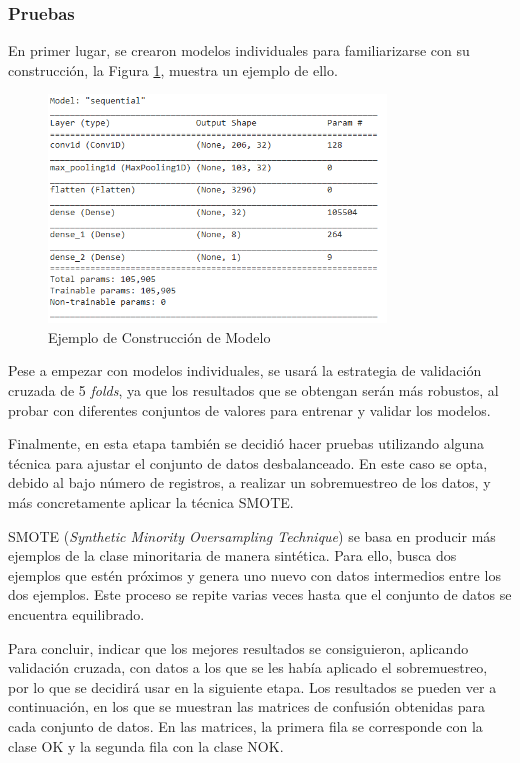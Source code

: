 \subsubsection{Pruebas}
En primer lugar, se crearon modelos individuales para familiarizarse con su construcción, la Figura \ref{f:modelo1}, muestra un ejemplo de ello.  

\begin{figure}[h]
 \centering
  \includegraphics[width=0.8\textwidth]{img/modelo1.PNG}
 \caption{Ejemplo de Construcción de Modelo}
 \label{f:modelo1}
\end{figure}

Pese a empezar con modelos individuales, se usará la estrategia de validación cruzada de 5 \emph{folds}, ya que los resultados que se obtengan serán más robustos, al probar con diferentes conjuntos de valores para entrenar y validar los modelos.

Finalmente, en esta etapa también se decidió hacer pruebas utilizando alguna técnica para ajustar el conjunto de datos desbalanceado. En este caso se opta, debido al bajo número de registros, a realizar un sobremuestreo de los datos, y más concretamente aplicar la técnica SMOTE.

SMOTE (\emph{Synthetic Minority Oversampling Technique}) se basa en producir más ejemplos de la clase minoritaria de manera sintética. Para ello, busca dos ejemplos que estén próximos y genera uno nuevo con datos intermedios entre los dos ejemplos. Este proceso se repite varias veces hasta que el conjunto de datos se encuentra equilibrado.

Para concluir, indicar que los mejores resultados se consiguieron, aplicando validación cruzada, con datos a los que se les había aplicado el sobremuestreo, por lo que se decidirá usar en la siguiente etapa. Los resultados se pueden ver a continuación, en los que se muestran las matrices de confusión obtenidas para cada conjunto de datos. En las matrices, la primera fila se corresponde con la clase OK y la segunda fila con la clase NOK.

